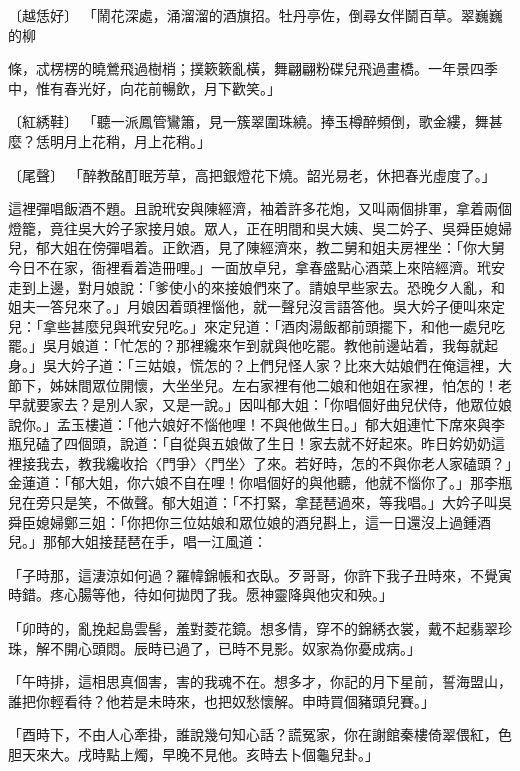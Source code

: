 〔越恁好〕  「鬧花深處，涌溜溜的酒旗招。牡丹亭佐，倒尋女伴鬬百草。翠巍巍的柳

條，忒楞楞的曉鶯飛過樹梢；撲簌簌亂橫，舞翩翩粉碟兒飛過畫橋。一年景四季中，惟有春光好，向花前暢飲，月下歡笑。」

〔紅綉鞋〕  「聽一派鳳管鸞簫，見一簇翠圍珠繞。捧玉樽醉頻倒，歌金縷，舞甚麼？恁明月上花稍，月上花稍。」

〔尾聲〕  「醉教酩酊眠芳草，高把銀燈花下燒。韶光易老，休把春光虛度了。」

這裡彈唱飯酒不題。且說玳安與陳經濟，袖着許多花炮，又叫兩個排軍，拿着兩個燈籠，竟往吳大妗子家接月娘。眾人，正在明間和吳大姨、吳二妗子、吳舜臣媳婦兒，郁大姐在傍彈唱着。正飲酒，見了陳經濟來，教二舅和姐夫房裡坐：「你大舅今日不在家，衙裡看着造冊哩。」一面放卓兒，拿春盛點心酒菜上來陪經濟。玳安走到上邊，對月娘說：「爹使小的來接娘們來了。請娘早些家去。恐晚夕人亂，和姐夫一答兒來了。」月娘因着頭裡惱他，就一聲兒沒言語答他。吳大妗子便叫來定兒：「拿些甚麼兒與玳安兒吃。」來定兒道：「酒肉湯飯都前頭擺下，和他一處兒吃罷。」吳月娘道：「忙怎的？那裡纔來乍到就與他吃罷。教他前邊站着，我每就起身。」吳大妗子道：「三姑娘，慌怎的？上們兒怪人家？比來大姑娘們在俺這裡，大節下，姊妹間眾位開懷，大坐坐兒。左右家裡有他二娘和他姐在家裡，怕怎的！老早就要家去？是別人家，又是一說。」因叫郁大姐：「你唱個好曲兒伏侍，他眾位娘說你。」孟玉樓道：「他六娘好不惱他哩！不與他做生日。」郁大姐連忙下席來與李瓶兒磕了四個頭，說道：「自從與五娘做了生日！家去就不好起來。昨日妗奶奶這裡接我去，教我纔收拾〈門爭〉〈門坐〉了來。若好時，怎的不與你老人家磕頭？」金蓮道：「郁大姐，你六娘不自在哩！你唱個好的與他聽，他就不惱你了。」那李瓶兒在旁只是笑，不做聲。郁大姐道：「不打緊，拿琵琶過來，等我唱。」大妗子叫吳舜臣媳婦鄭三姐：「你把你三位姑娘和眾位娘的酒兒斟上，這一日還沒上過鍾酒兒。」那郁大姐接琵琶在手，唱一江風道：

「子時那，這淒涼如何過？羅幃錦帳和衣臥。歹哥哥，你許下我子丑時來，不覺寅時錯。疼心腸等他，待如何拋閃了我。愿神靈降與他灾和殃。」

「卯時的，亂挽起島雲髻，羞對菱花鏡。想多情，穿不的錦綉衣裳，戴不起翡翠珍珠，解不開心頭悶。辰時已過了，已時不見影。奴家為你憂成病。」

「午時排，這相思真個害，害的我魂不在。想多才，你記的月下星前，誓海盟山，誰把你輕看待？他若是未時來，也把奴愁懷解。申時買個豬頭兒賽。」

「酉時下，不由人心牽掛，誰說幾句知心話？謊冤家，你在謝館秦樓倚翠偎紅，色胆天來大。戌時點上燭，早晚不見他。亥時去卜個龜兒卦。」

